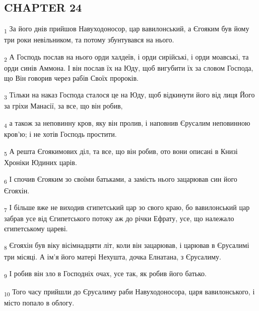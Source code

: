 \subsection{CHAPTER 24}
\begin{tcolorbox}
\textsubscript{1} За його днів прийшов Навуходоносор, цар вавилонський, а Єгояким був йому три роки невільником, та потому збунтувався на нього.
\end{tcolorbox}
\begin{tcolorbox}
\textsubscript{2} А Господь послав на нього орди халдеїв, і орди сирійські, і орди моавські, та орди синів Аммона. І він послав їх на Юду, щоб вигубити їх за словом Господа, що Він говорив через рабів Своїх пророків.
\end{tcolorbox}
\begin{tcolorbox}
\textsubscript{3} Тільки на наказ Господа сталося це на Юду, щоб відкинути його від лиця Його за гріхи Манасії, за все, що він робив,
\end{tcolorbox}
\begin{tcolorbox}
\textsubscript{4} а також за неповинну кров, яку він пролив, і наповнив Єрусалим неповинною кров'ю; і не хотів Господь простити.
\end{tcolorbox}
\begin{tcolorbox}
\textsubscript{5} А решта Єгоякимових діл, та все, що він робив, ото вони описані в Книзі Хроніки Юдиних царів.
\end{tcolorbox}
\begin{tcolorbox}
\textsubscript{6} І спочив Єгояким зо своїми батьками, а замість нього зацарював син його Єгояхін.
\end{tcolorbox}
\begin{tcolorbox}
\textsubscript{7} І більше вже не виходив єгипетський цар зо свого краю, бо вавилонський цар забрав усе від Єгипетського потоку аж до річки Ефрату, усе, що належало єгипетському цареві.
\end{tcolorbox}
\begin{tcolorbox}
\textsubscript{8} Єгояхін був віку вісімнадцяти літ, коли він зацарював, і царював в Єрусалимі три місяці. А ім'я його матері Нехушта, дочка Елнатана, з Єрусалиму.
\end{tcolorbox}
\begin{tcolorbox}
\textsubscript{9} І робив він зло в Господніх очах, усе так, як робив його батько.
\end{tcolorbox}
\begin{tcolorbox}
\textsubscript{10} Того часу прийшли до Єрусалиму раби Навуходоносора, царя вавилонського, і місто попало в облогу.
\end{tcolorbox}
